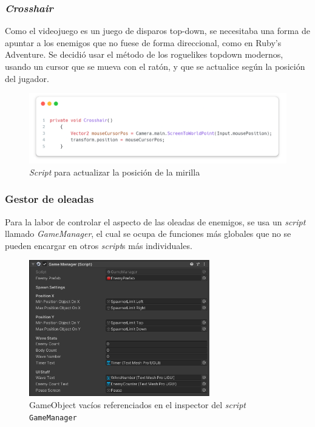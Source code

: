 \documentclass[11pt]{article}
\begin{document}
        \subsubsection{\textit{Crosshair}}
            Como el videojuego es un juego de disparos top-down, se necesitaba una forma de apuntar a los enemigos  que no fuese de forma direccional, como en Ruby's Adventure. Se decidió usar el método de los roguelikes topdown modernos, usando un cursor que se mueva con el ratón, y que se actualice según la posición del jugador.\\
            \begin{figure}[H]
                \centering
                \includegraphics[width=\textwidth]{Images/Misc/crosshair.png}
                \caption{\textit{Script} para actualizar la posición de la mirilla}
            \end{figure}
        
        \newpage
        \subsubsection{Gestor de oleadas}
            Para la labor de controlar el aspecto de las oleadas de enemigos, se usa un \textit{script} llamado \textit{GameManager}, el cual se ocupa de funciones más globales que no se pueden encargar en otros \textit{script}s más individuales.\\
            \begin{figure}[H]
                \centering
                \includegraphics[width=0.7\textwidth]{Images/Misc/inspectorgamemanager.png}
                \caption{GameObject vacíos referenciados en el inspector del \textit{script} \texttt{GameManager}}
                \label{fig:inspectorgamemanager}
            \end{figure}
\end{document}
